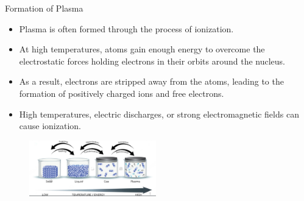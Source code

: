 \documentclass[13pt]{beamer}
\begin{document}
	\begin{frame}[t]{Formation of Plasma}
		\begin{itemize}
			\item Plasma is often formed through the process of {\color{magenta}ionization}.
		\item	At high temperatures, atoms gain enough energy to overcome the electrostatic forces holding electrons in their orbits around the nucleus.

		\item 	As a result, electrons are stripped away from the atoms, leading to the formation of positively charged ions and free electrons.
		\item {\color{red} High temperatures, electric discharges, or strong electromagnetic fields} can cause ionization.



		\end{itemize}
%
%

%
%
%

	\begin{figure}
	\centering
		\href{https://www.collegenp.com/uploads/2023/10/Plasma-The-Fourth-State-of-Matter-Explained.jpg}{
	\includegraphics[width = 5.5cm]{Images/formation.jpeg}}
\end{figure}



	\end{frame}
\end{document}
